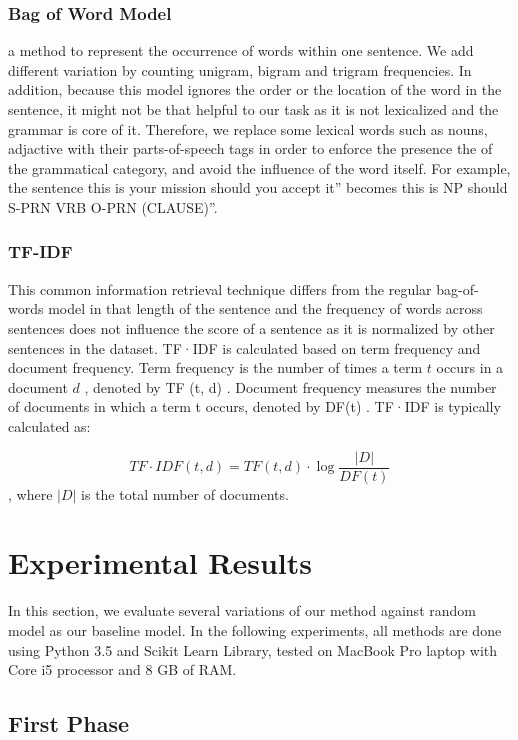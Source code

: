 \subsubsection{Bag of Word Model} a method to represent the occurrence of words within one sentence. We add different variation by counting unigram, bigram and trigram frequencies. In addition, because this model ignores the order or the location of the word in the sentence, it might not be that helpful to our task as it is not lexicalized and the grammar is core of it. Therefore, we replace some lexical words such as nouns, adjactive with their parts-of-speech tags in order to enforce the presence the of the grammatical category, and avoid the influence of the word itself.  For example, the sentence this is your mission should you accept it” becomes this is NP should S-PRN VRB O-PRN (CLAUSE)”. 

\subsubsection{TF-IDF}  This common information retrieval technique differs from the regular bag-of-words model in that length of the sentence and the frequency of words across sentences does not influence the score of a sentence as it is normalized by other sentences in the dataset. TF·IDF is calculated based on term frequency and document frequency. Term frequency is the number of times a term $t$ occurs in a document $d$ , denoted by TF (t, d) . Document frequency measures the number
of documents in which a term t occurs, denoted by DF(t) . TF·IDF is typically calculated as:

$$T F \cdot I D F ( t , d ) = T F ( t , d ) \cdot \log \frac { | D | } { D F ( t ) }$$, where $|D|$ is the total number of documents.





\section{Experimental Results}
\label{sec:exp}

In this section, we evaluate several variations of our method against random model as our baseline model. In the following experiments, all methods are done using Python 3.5 and Scikit Learn Library, tested on MacBook Pro laptop with Core i5 processor and 8 GB of RAM.

\subsection{First Phase}

